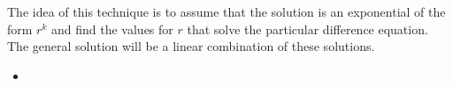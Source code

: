 \begin{important}
The idea of this technique is to assume that the solution is an exponential of the form $r^k$ and find the values for $r$ that solve the particular difference equation. The general solution will be a linear combination of these solutions.
\end{important}

\begin{video}
\begin{itemize}
	\item {}
\end{itemize}	
\end{video}



